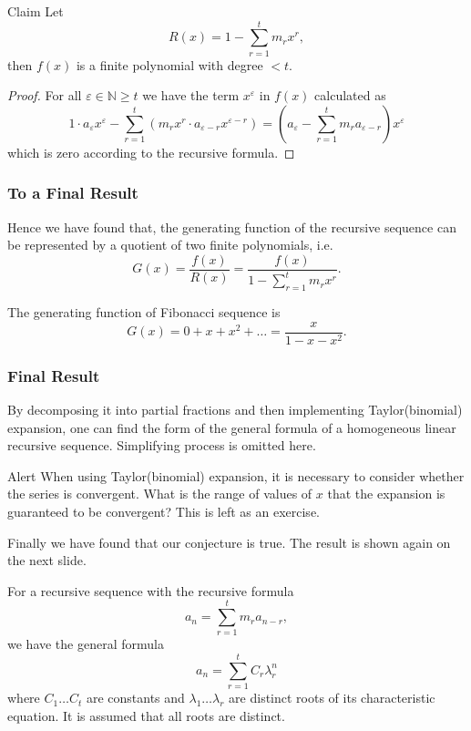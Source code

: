 \documentclass{beamer}
\theoremstyle{definition}
\theoremstyle{remark}
\begin{document}
\begin{frame}
  \begin{block}{Claim}
    Let
   \[
     R(x) = 1 - \sum_{r=1}^t m_r x^r,
   \]
    then $f(x)$ is a finite polynomial with degree $<t$.
  \end{block}
  \begin{proof}
    For all $\varepsilon \in \mathbb{N}\geq t$ we have 
    the term $x^\varepsilon$ in $f(x)$ 
    calculated as \[
         1\cdot a_\varepsilon x^\varepsilon 
         - \sum_{r=1}^t (m_r x^r \cdot a_{\varepsilon-r}x^{\varepsilon-r})
         = \left(a_\varepsilon-\sum_{r=1}^t m_r a_{\varepsilon-r}\right)x^\varepsilon \]
    which is zero according to the recursive formula.
  \end{proof} 
\end{frame}
\begin{frame}
  \frametitle{To a Final Result}
  Hence we have found that, the generating function 
  of the recursive sequence can be represented by
  a quotient of two finite polynomials, i.e. \[
    G(x) = \frac{f(x)}{R(x)} = \frac{f(x)}{1 - \sum_{r=1}^t m_r x^r}. \]
  \begin{examples}[Fibonacci]
     The generating function of Fibonacci sequence
     is \[
       G(x) = 0 + x + x^2 +\dots = \frac{x}{1-x-x^2}.
     \]
  \end{examples}
\end{frame}
\begin{frame}
  \frametitle{Final Result}
  By decomposing it into partial fractions and then 
  implementing Taylor(binomial) expansion, one can find
  the form of the general formula of a homogeneous linear 
  recursive sequence. Simplifying process is omitted here. 
  \begin{alertblock}{Alert}
    When using Taylor(binomial) expansion, it is necessary 
    to consider whether the series is convergent. What is the 
    range of values of $x$ that the expansion is guaranteed to 
    be convergent? This is left as an exercise.
  \end{alertblock}
  Finally we have found that our conjecture is true. 
  The result is shown again on the next slide.
\end{frame}
\begin{frame}
  \begin{theorem}
     For a recursive sequence with the recursive formula \[
      a_n = \sum_{r=1}^t m_r a_{n-r},
     \]
     we have the general formula \[
       a_n = \sum_{r=1}^{t} C_r \lambda_r^n 
     \]
     where $C_1\dots C_t$ are constants and $\lambda_1\dots \lambda_r$
     are distinct roots of its 
     characteristic equation. It is assumed that
     all roots are distinct. 
 
 \end{theorem}
\end{frame}
\end{document}
